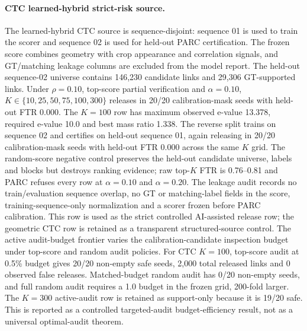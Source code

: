 \documentclass[11pt]{article}
\begin{document}
\paragraph{CTC learned-hybrid strict-risk source.}
The learned-hybrid CTC source is sequence-disjoint: sequence 01 is used to train the scorer and sequence 02 is used for held-out PARC certification.
The frozen score combines geometry with crop appearance and correlation signals, and GT/matching leakage columns are excluded from the model report.
The held-out sequence-02 universe contains 146,230 candidate links and 29,306 GT-supported links.
Under \(\rho=0.10\), top-score partial verification and \(\alpha=0.10\), \(K\in\{10,25,50,75,100,300\}\) releases in 20/20 calibration-mask seeds with held-out FTR 0.000.
The \(K=100\) row has maximum observed e-value 13.378, required e-value 10.0 and best mass ratio 1.338.
The reverse split trains on sequence 02 and certifies on held-out sequence 01, again releasing in 20/20 calibration-mask seeds with held-out FTR 0.000 across the same \(K\) grid.
The random-score negative control preserves the held-out candidate universe, labels and blocks but destroys ranking evidence; raw top-\(K\) FTR is 0.76--0.81 and PARC refuses every row at \(\alpha=0.10\) and \(\alpha=0.20\).
The leakage audit records no train/evaluation sequence overlap, no GT or matching-label fields in the score, training-sequence-only normalization and a scorer frozen before PARC calibration.
This row is used as the strict controlled AI-assisted release row; the geometric CTC row is retained as a transparent structured-source control.
The active audit-budget frontier varies the calibration-candidate inspection budget under top-score and random audit policies.
For CTC \(K=100\), top-score audit at 0.5\% budget gives 20/20 non-empty safe seeds, 2,000 total released links and 0 observed false releases.
Matched-budget random audit has 0/20 non-empty seeds, and full random audit requires a 1.0 budget in the frozen grid, 200-fold larger.
The \(K=300\) active-audit row is retained as support-only because it is 19/20 safe.
This is reported as a controlled targeted-audit budget-efficiency result, not as a universal optimal-audit theorem.
\end{document}
